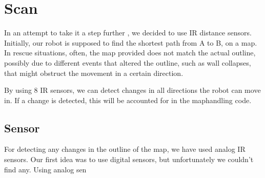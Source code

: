 \chapter{Scan}\label{ch:scan}
In an attempt to take it a step further , we decided to use IR distance sensors. 
Initially, our robot is supposed to find the 
shortest path from A to B, on a map. 
In rescue situations, often, the map provided does not match 
the actual outline, possibly due to different events that 
altered the outline, such as wall collapses, that might 
obstruct the movement in a certain direction.

By using 8 IR sensors, we can detect changes in all directions 
the robot can move in. If a change is detected, this will be
accounted for in the maphandling code.


\section{Sensor}\label{sec:sensor}
For detecting any changes in the outline of the map, we have 
used analog IR sensors. Our first idea was to use digital
sensors, but unfortunately we couldn't find any. Using analog sen